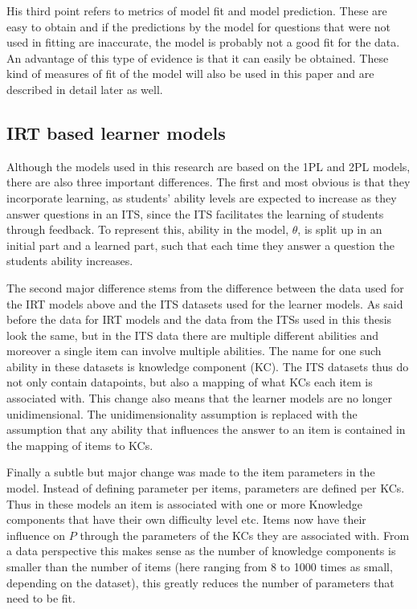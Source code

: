 \documentclass{scrartcl}
\begin{document}
His third point refers to metrics of model fit and model prediction. These are easy to obtain and if the predictions by the model for questions that were not used in fitting are inaccurate, the model is probably not a good fit for the data. An advantage of this type of evidence is that it can easily be obtained. These kind of measures of fit of the model will also be used in this paper and are described in detail later as well. 

\subsection{IRT based learner models}
Although the models used in this research are based on the 1PL and 2PL models, there are also three important differences. The first and most obvious is that they incorporate learning, as students' ability levels are expected to increase as they answer questions in an ITS, since the ITS facilitates the learning of students through feedback. To represent this, ability in the model, $\theta$, is split up in an initial part and a learned part, such that each time they answer a question the students ability increases.

The second major difference stems from the difference between the data used for the IRT models above and the ITS datasets used for the learner models. As said before the data for IRT models and the data from the ITSs used in this thesis look the same, but in the ITS data there are multiple different abilities and moreover a single item can involve multiple abilities. The name for one such ability in these datasets is knowledge component (KC). The ITS datasets thus do not only contain datapoints, but also a mapping of what KCs each item is associated with.
This change also means that the learner models are no longer unidimensional. The unidimensionality assumption is replaced with the assumption that any ability that influences the answer to an item is contained in the mapping of items to KCs.

Finally a subtle but major change was made to the item parameters in the model. Instead of defining parameter per items, parameters are defined per KCs. Thus in these models an item is associated with one or more Knowledge components that have their own difficulty level etc. Items now have their influence on $P$ through the parameters of the KCs they are associated with. From a data perspective this makes sense as the number of knowledge components is smaller than the number of items (here ranging from 8 to 1000 times as small, depending on the dataset), this greatly reduces the number of parameters that need to be fit. 
\end{document}
